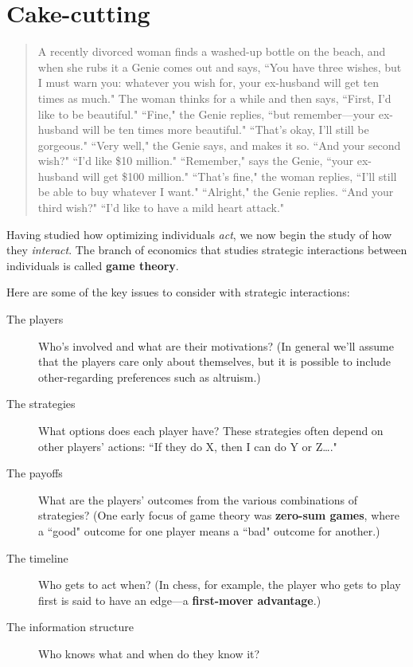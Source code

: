 
\chapter{Cake-cutting}
\label{2cake}


\begin{quote}
A recently divorced woman finds a washed-up bottle on the beach, and when she rubs it a Genie comes out and says, ``You have three wishes, but I must warn you: whatever you wish for, your ex-husband will get ten times as much." The woman thinks for a while and then says, ``First, I'd like to be beautiful." ``Fine," the Genie replies, ``but remember---your ex-husband will be ten times more beautiful." ``That's okay, I'll still be gorgeous." ``Very well," the Genie says, and makes it so. ``And your second wish?" ``I'd like \$10 million." ``Remember," says the Genie, ``your ex-husband will get \$100 million." ``That's fine," the woman replies, ``I'll still be able to buy whatever I want." ``Alright," the Genie replies. ``And your third wish?" ``I'd like to have a mild heart attack."
\end{quote}

\vspace*{.4cm}

\noindent Having studied how optimizing individuals \textit{act}, we now begin the study of how they \emph{interact}. The branch of economics that studies strategic interactions between individuals is called \textbf{game theory}. %

Here are some of the key issues to consider with strategic interactions:
\begin{description}
\item[The players] Who's involved and what are their motivations? (In general we'll assume that the players care only about themselves, but it is possible to include other-regarding preferences such as altruism.)
\item[The strategies] What options does each player have? These strategies often depend on other players' actions: ``If they do X, then I can do Y or Z\ldots."
\item[The payoffs] What are the players' outcomes from the various combinations of strategies? (One early focus of game theory was \textbf{zero-sum games}, where a ``good" outcome for one player means a ``bad" outcome for another.)
\item[The timeline] Who gets to act when? (In chess, for example, the player who gets to play first is said to have an edge---a \textbf{first-mover advantage}.)
\item[The information structure] Who knows what and when do they know it?
\end{description}



